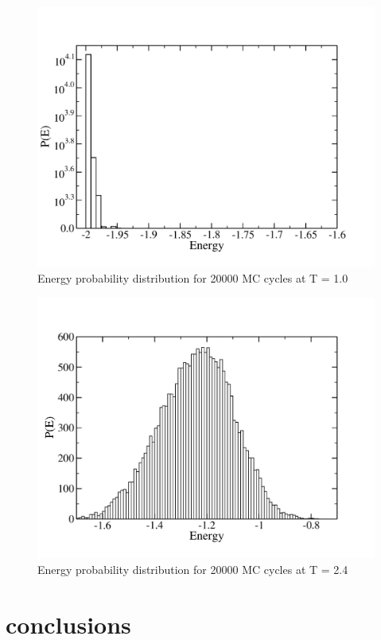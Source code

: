 \documentclass[prc,amsmath,twocolumn,superscriptaddress]{revtex4}
\begin{document}
\begin{figure}[h]
\includegraphics[scale=0.33]{ei_1.pdf}
\caption{Energy probability distribution for 20000 MC cycles at T = 1.0}
\label{ei_1}
\end{figure}

\begin{figure}[h]
\includegraphics[scale=0.33]{ei_2.pdf}
\caption{Energy probability distribution for 20000 MC cycles at T = 2.4}
\label{ei_2}
\end{figure}


\section{conclusions}
\label{conc}
\end{document}
